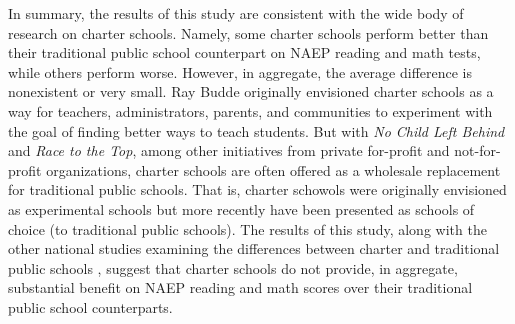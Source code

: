 \documentclass[letterpaper,12pt]{article} %
\begin{document}
In summary, the results of this study are consistent with the wide body of research on charter schools. Namely, some charter schools perform better than their traditional public school counterpart on NAEP reading and math tests, while others perform worse. However, in aggregate, the average difference is nonexistent or very small. Ray Budde \citeyear{Budde1988} originally envisioned charter schools as a way for teachers, administrators, parents, and communities to experiment with the goal of finding better ways to teach students. But with \textit{No Child Left Behind} and \textit{Race to the Top}, among other initiatives from private for-profit and not-for-profit organizations, charter schools are often offered as a wholesale replacement for traditional public schools. That is, charter schowols were originally envisioned as experimental schools but more recently have been presented as schools of choice (to traditional public schools). The results of this study, along with the other national studies examining the differences between charter and traditional public schools \cite{credo,credo2013,BraunJenkinsGrigg2006}, suggest that charter schools do not provide, in aggregate, substantial benefit on NAEP reading and math scores over their traditional public school counterparts.





\end{document}
